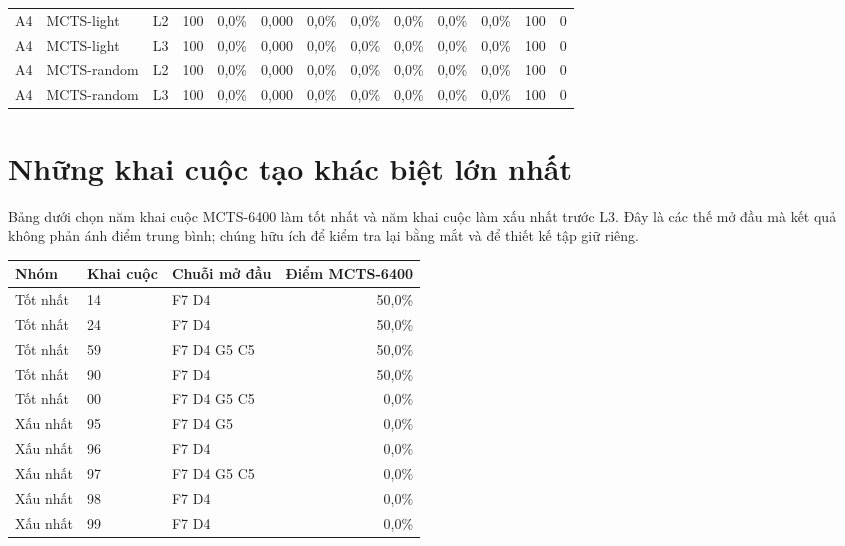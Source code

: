 \begin{center}
\begin{tabular}{@{}llrrrrrrrrrrr@{}}
A4 & MCTS-light & L2 & 100 & 0,0\% & 0,000 & 0,0\% & 0,0\% & 0,0\% & 0,0\% & 0,0\% & 100 & 0 \\

A4 & MCTS-light & L3 & 100 & 0,0\% & 0,000 & 0,0\% & 0,0\% & 0,0\% & 0,0\% & 0,0\% & 100 & 0 \\

A4 & MCTS-random & L2 & 100 & 0,0\% & 0,000 & 0,0\% & 0,0\% & 0,0\% & 0,0\% & 0,0\% & 100 & 0 \\

A4 & MCTS-random & L3 & 100 & 0,0\% & 0,000 & 0,0\% & 0,0\% & 0,0\% & 0,0\% & 0,0\% & 100 & 0 \\

\bottomrule

\end{tabular}

\end{center}

\section{Những khai cuộc tạo khác biệt lớn nhất}

Bảng dưới chọn năm khai cuộc MCTS-6400 làm tốt nhất và năm khai cuộc làm xấu nhất trước L3. Đây là các thế mở đầu mà kết quả không phản ánh điểm trung bình; chúng hữu ích để kiểm tra lại bằng mắt và để thiết kế tập giữ riêng.

\begin{center}\small

\begin{tabular}{@{}lllr@{}}

\toprule

Nhóm & Khai cuộc & Chuỗi mở đầu & Điểm MCTS-6400 \\

\midrule

Tốt nhất & 14 & F7 D4 & 50,0\% \\

Tốt nhất & 24 & F7 D4 & 50,0\% \\

Tốt nhất & 59 & F7 D4 G5 C5 & 50,0\% \\

Tốt nhất & 90 & F7 D4 & 50,0\% \\

Tốt nhất & 00 & F7 D4 G5 C5 & 0,0\% \\

Xấu nhất & 95 & F7 D4 G5 & 0,0\% \\

Xấu nhất & 96 & F7 D4 & 0,0\% \\

Xấu nhất & 97 & F7 D4 G5 C5 & 0,0\% \\

Xấu nhất & 98 & F7 D4 & 0,0\% \\

Xấu nhất & 99 & F7 D4 & 0,0\% \\

\bottomrule

\end{tabular}

\end{center}


